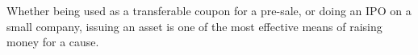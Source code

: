 Whether being used as a transferable coupon for a pre-sale, or doing an IPO on
a small company, issuing an asset is one of the most effective means of raising
money for a cause.
